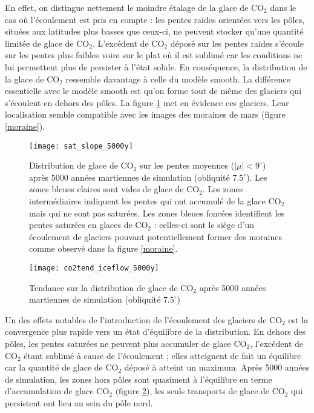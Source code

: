 \documentclass[11pt,a4paper]{article}
\begin{document}
En effet, on distingue nettement le moindre étalage de la glace de CO$_2$ dans le cas où l'écoulement est pris en compte : les pentes raides orientées vers les pôles, situées aux latitudes plus basses que ceux-ci, ne peuvent stocker qu'une quantité limitée de glace de CO$_2$. L'excédent de CO$_2$ déposé sur les pentes raides s'écoule sur les pentes plus faibles voire sur le plat où il est sublimé car les conditions ne lui permettent plus de persister à l'état solide. En conséquence, la distribution de la glace de CO$_2$ ressemble davantage à celle du modèle smooth. La différence essentielle avec le modèle smooth est qu'on forme tout de même des glaciers qui s'écoulent en dehors des pôles. La figure \ref{sat_slope_5000y} met en évidence ces glaciers. Leur localisation semble compatible avec les images des moraines de mars (figure \ref{moraine}). \\

\begin{figure}[h!]
\begin{center}
\texttt{[image: sat\_slope\_5000y]}
\caption{Distribution de glace de CO$_2$ sur les pentes moyennes ($|\mu| < 9^\circ $) après 5000 années martiennes de simulation (obliquité $7.5^\circ$). Les zones bleues claires sont vides de glace de CO$_2$. Les zones intermédiaires indiquent les pentes qui ont accumulé de la glace CO$_2$ mais qui ne sont pas saturées. Les zones bleues foncées identifient les pentes saturées en glaces de CO$_2$ : celles-ci sont le siège d'un écoulement de glaciers pouvant potentiellement former des moraines comme observé dans la figure \ref{moraine}. }
\label{sat_slope_5000y}
\end{center}
\end{figure}

\begin{figure}[h!]
\begin{center}
\texttt{[image: co2tend\_iceflow\_5000y]}
\caption{ Tendance sur la distribution de glace de CO$_2$ après 5000 années martiennes de simulation (obliquité $7.5^\circ$) }
\label{co2tend_iceflow_5000y}
\end{center}
\end{figure}

Un des effets notables de l'introduction de l'écoulement des glaciers de CO$_2$ est la convergence plus rapide vers un état d'équilibre de la distribution. En dehors des pôles, les pentes saturées ne peuvent plus accumuler de glace CO$_2$, l'excédent de CO$_2$ étant sublimé à cause de l'écoulement ; elles atteignent de fait un équilibre car la quantité de glace de CO$_2$ déposé à atteint un maximum. Après 5000 années de simulation, les zones hors pôles sont quasiment à l'équilibre en terme d'accumulation de glace CO$_2$ (figure \ref{co2tend_iceflow_5000y}), les seuls transports de glace de CO$_2$ qui persistent ont lieu au sein du pôle nord. 
\end{document}
